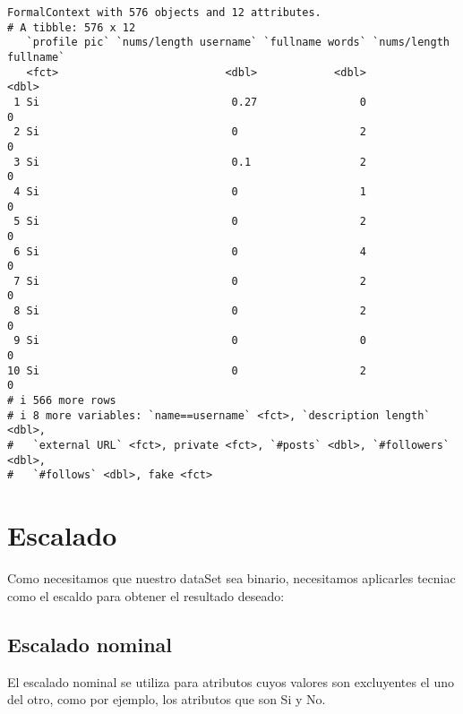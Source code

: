 \documentclass[
  letterpaper,
  DIV=11,
  numbers=noendperiod]{scrreprt}
\begin{document}
\begin{verbatim}
FormalContext with 576 objects and 12 attributes.
# A tibble: 576 x 12
   `profile pic` `nums/length username` `fullname words` `nums/length fullname`
   <fct>                          <dbl>            <dbl>                  <dbl>
 1 Si                              0.27                0                      0
 2 Si                              0                   2                      0
 3 Si                              0.1                 2                      0
 4 Si                              0                   1                      0
 5 Si                              0                   2                      0
 6 Si                              0                   4                      0
 7 Si                              0                   2                      0
 8 Si                              0                   2                      0
 9 Si                              0                   0                      0
10 Si                              0                   2                      0
# i 566 more rows
# i 8 more variables: `name==username` <fct>, `description length` <dbl>,
#   `external URL` <fct>, private <fct>, `#posts` <dbl>, `#followers` <dbl>,
#   `#follows` <dbl>, fake <fct>
\end{verbatim}

\section{Escalado}\label{escalado}

Como necesitamos que nuestro dataSet sea binario, necesitamos aplicarles
tecniac como el escaldo para obtener el resultado deseado:

\subsection{Escalado nominal}\label{escalado-nominal}

El escalado nominal se utiliza para atributos cuyos valores son
excluyentes el uno del otro, como por ejemplo, los atributos que son Si
y No.
\end{document}
